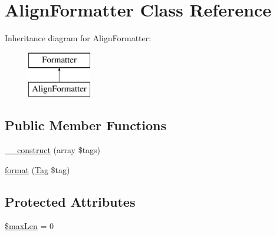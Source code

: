 \hypertarget{classphp_documentor_1_1_reflection_1_1_doc_block_1_1_tags_1_1_formatter_1_1_align_formatter}{}\section{Align\+Formatter Class Reference}
\label{classphp_documentor_1_1_reflection_1_1_doc_block_1_1_tags_1_1_formatter_1_1_align_formatter}
Inheritance diagram for Align\+Formatter\+:\begin{figure}[H]
\begin{center}
\leavevmode
\includegraphics[height=2.000000cm]{classphp_documentor_1_1_reflection_1_1_doc_block_1_1_tags_1_1_formatter_1_1_align_formatter}
\end{center}
\end{figure}
\subsection*{Public Member Functions}
\begin{DoxyCompactItemize}
\item 
\mbox{\hyperlink{classphp_documentor_1_1_reflection_1_1_doc_block_1_1_tags_1_1_formatter_1_1_align_formatter_a556fe336663bd418c7c1fb466dc006d1}{\+\_\+\+\_\+construct}} (array \$tags)
\item 
\mbox{\hyperlink{classphp_documentor_1_1_reflection_1_1_doc_block_1_1_tags_1_1_formatter_1_1_align_formatter_a237fc645f9f13d476abbb368c53b64d0}{format}} (\mbox{\hyperlink{interfacephp_documentor_1_1_reflection_1_1_doc_block_1_1_tag}{Tag}} \$tag)
\end{DoxyCompactItemize}
\subsection*{Protected Attributes}
\begin{DoxyCompactItemize}
\item 
\mbox{\hyperlink{classphp_documentor_1_1_reflection_1_1_doc_block_1_1_tags_1_1_formatter_1_1_align_formatter_ae7f471d243a8d922857b920d87cfd858}{\$max\+Len}} = 0
\end{DoxyCompactItemize}


